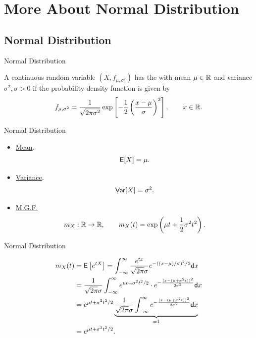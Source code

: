 \section{More About Normal Distribution}

\subsection{Normal Distribution}

\begin{frame}{Normal Distribution}

\justifying
{} A continuous random variable $(X, f_{\mu, \sigma^2})$ has the  with mean $\mu \in \mathbb{R}$ and variance $\sigma^2, \sigma > 0$ if the probability density function is given by
\begin{align*}
f_{\mu, \sigma^2} = \frac{1}{\sqrt{2\pi \sigma^2}} \exp\left[-\frac{1}{2}\left(\frac{x-\mu}{\sigma} \right)^2 \right], \qquad x\in \mathbb{R}.
\end{align*}

\end{frame}

\begin{frame}{Normal Distribution}

\justifying
{} 
\begin{itemize}
\justifying
\item \underline{Mean}. 
\begin{align*}
\mathsf{E}[X] = \mu.
\end{align*}
\item \underline{Variance}.
\begin{align*}
\mathsf{Var}[X] = \sigma^2.
\end{align*}
\item \underline{M.G.F.}
\begin{align*}
m_X: \mathbb{R} \rightarrow \mathbb{R}, \qquad m_X(t) = \exp\left(\mu t + \frac{1}{2}\sigma^2t^2 \right).
\end{align*}
\end{itemize}

\end{frame}

\begin{frame}{Normal Distribution}

\begin{align*}
m_X(t) & = \mathsf{E}\left[e^{tX} \right] = \int_{-\infty}^{\infty} \frac{e^{tx}}{\sqrt{2\pi }\sigma} e^{-((x-\mu)/\sigma)^2/2}\mathsf{d}x \\
& = \frac{1}{\sqrt{2\pi}\sigma} \int_{-\infty}^{\infty} e^{\mu t + \sigma^2 t^2/2} \cdot e^{-\frac{(x-(\mu + \sigma^2 t))^2}{2\sigma^2}} \mathsf{d}x \\
& = e^{\mu t + \sigma^2 t^2/2} \underbrace{\frac{1}{\sqrt{2\pi}\sigma} \int_{-\infty}^{\infty} e^{-\frac{(x-(\mu + \sigma^2 t))^2}{2\sigma^2}} \mathsf{d}x}_{= 1} \\
& = e^{\mu t + \sigma^2 t^2/2}.
\end{align*}

\end{frame}

